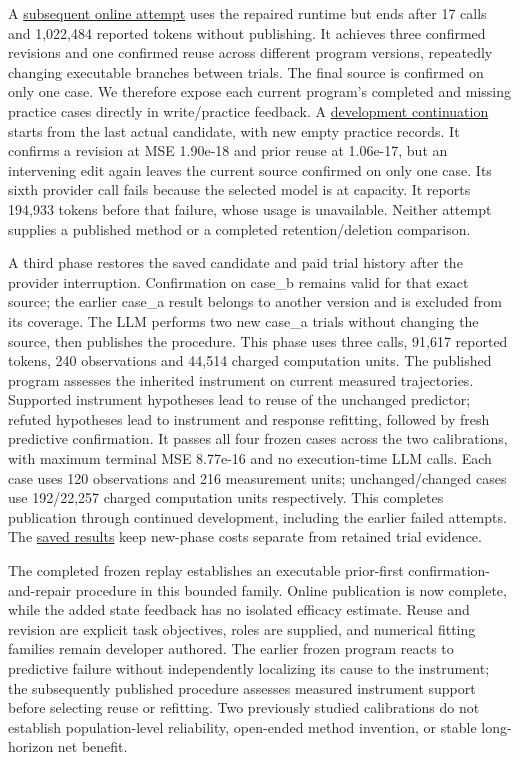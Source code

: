 \documentclass[11pt,a4paper]{article}
\begin{document}
A \hyperlink{artifact-64}{subsequent online attempt}
uses the repaired runtime but ends after 17 calls and 1,022,484 reported tokens
without publishing. It achieves three confirmed revisions and one confirmed reuse
across different program versions, repeatedly changing executable branches between
trials. The final source is confirmed on only one case. We therefore expose each
current program's completed and missing practice cases directly in write/practice
feedback. A \hyperlink{artifact-65}{development continuation}
starts from the last actual candidate, with new empty practice records. It confirms
a revision at MSE 1.90e-18 and prior reuse at 1.06e-17, but an intervening edit again
leaves the current source confirmed on only one case. Its sixth provider call fails
because the selected model is at capacity. It reports 194,933 tokens before that
failure, whose usage is unavailable. Neither attempt supplies a published method
or a completed retention/deletion comparison.


A third phase restores the saved candidate and paid trial history after the
provider interruption. Confirmation on case\_b remains valid for that exact source;
the earlier case\_a result belongs to another version and is excluded from its
coverage. The LLM performs two new case\_a trials without changing the source, then
publishes the procedure. This phase uses three calls, 91,617 reported tokens,
240 observations and 44,514 charged computation units. The published program
assesses the inherited instrument on current measured trajectories. Supported
instrument hypotheses lead to reuse of the unchanged predictor; refuted hypotheses
lead to instrument and response refitting, followed by fresh predictive confirmation.
It passes all four frozen cases across the two calibrations, with maximum terminal
MSE 8.77e-16 and no execution-time LLM calls. Each case uses 120 observations and
216 measurement units; unchanged/changed cases use 192/22,257 charged computation
units respectively. This completes publication through continued development,
including the earlier failed attempts. The \hyperlink{artifact-66}{saved results}
keep new-phase costs separate from retained trial evidence.


The completed frozen replay establishes an executable prior-first confirmation-and-repair
procedure in this bounded family. Online publication is now complete, while the
added state feedback has no isolated efficacy estimate. Reuse and revision are
explicit task objectives, roles are supplied, and numerical fitting families remain
developer authored. The earlier frozen program reacts to predictive failure without
independently localizing its cause to the instrument; the subsequently published
procedure assesses measured instrument support before selecting reuse or refitting.
Two previously studied calibrations do not establish population-level reliability,
open-ended method invention, or stable long-horizon net benefit.
\end{document}
